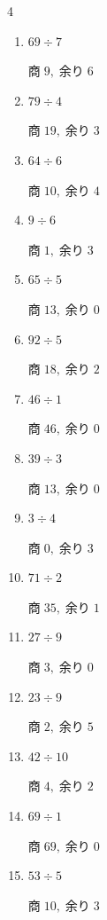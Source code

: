 \begin{multicols}{4}
\begin{enumerate}
\columnbreak %

  \item $69 \div 7$

        $商\; 9,\; 余り\; 6$

  \item $79 \div 4$

        $商\; 19,\; 余り\; 3$

  \item $64 \div 6$

        $商\; 10,\; 余り\; 4$

  \item $9 \div 6$

        $商\; 1,\; 余り\; 3$

  \item $65 \div 5$

        $商\; 13,\; 余り\; 0$

  \item $92 \div 5$

        $商\; 18,\; 余り\; 2$

  \item $46 \div 1$

        $商\; 46,\; 余り\; 0$

  \item $39 \div 3$

        $商\; 13,\; 余り\; 0$

  \item $3 \div 4$

        $商\; 0,\; 余り\; 3$

  \item $71 \div 2$

        $商\; 35,\; 余り\; 1$

  \item $27 \div 9$

        $商\; 3,\; 余り\; 0$

  \item $23 \div 9$

        $商\; 2,\; 余り\; 5$

  \item $42 \div 10$

        $商\; 4,\; 余り\; 2$

  \item $69 \div 1$

        $商\; 69,\; 余り\; 0$

  \item $53 \div 5$

        $商\; 10,\; 余り\; 3$


\end{enumerate}
\end{multicols}
